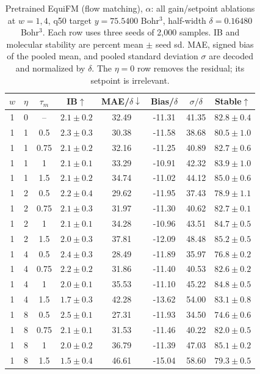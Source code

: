 \documentclass{article}
\begin{document}
\begin{table}[!htbp]
\centering\small
\caption{Pretrained EquiFM (flow matching), $\alpha$: all gain/setpoint ablations at $w=1,4$, q50 target $y=75.5400$ Bohr$^3$, half-width $\delta=0.16480$ Bohr$^3$. Each row uses three seeds of 2,000 samples. IB and molecular stability are percent mean $\pm$ seed sd. MAE, signed bias of the pooled mean, and pooled standard deviation $\sigma$ are decoded and normalized by $\delta$. The $\eta=0$ row removes the residual; its setpoint is irrelevant.}
\label{tab:grid-equifm-alpha}
\begin{tabular}{cccccccc}
\toprule
$w$ & $\eta$ & $\tau_m$ & IB$\uparrow$ & MAE/$\delta\downarrow$ & Bias/$\delta$ & $\sigma/\delta$ & Stable$\uparrow$\\
\midrule
1 & 0 & -- & $2.1\pm0.2$ & 32.49 & -11.31 & 41.35 & $82.8\pm0.4$\\
1 & 1 & 0.5 & $2.3\pm0.3$ & 30.38 & -11.58 & 38.68 & $80.5\pm1.0$\\
1 & 1 & 0.75 & $2.1\pm0.2$ & 32.16 & -11.25 & 40.89 & $82.7\pm0.6$\\
1 & 1 & 1 & $2.1\pm0.1$ & 33.29 & -10.91 & 42.32 & $83.9\pm1.0$\\
1 & 1 & 1.5 & $2.1\pm0.2$ & 34.74 & -11.02 & 44.12 & $85.0\pm0.6$\\
1 & 2 & 0.5 & $2.2\pm0.4$ & 29.62 & -11.95 & 37.43 & $78.9\pm1.1$\\
1 & 2 & 0.75 & $2.1\pm0.3$ & 31.97 & -11.30 & 40.62 & $82.7\pm0.1$\\
1 & 2 & 1 & $2.1\pm0.1$ & 34.28 & -10.96 & 43.51 & $84.7\pm0.5$\\
1 & 2 & 1.5 & $2.0\pm0.3$ & 37.81 & -12.09 & 48.48 & $85.2\pm0.5$\\
1 & 4 & 0.5 & $2.4\pm0.3$ & 28.49 & -11.89 & 35.97 & $76.8\pm0.2$\\
1 & 4 & 0.75 & $2.2\pm0.2$ & 31.86 & -11.40 & 40.53 & $82.6\pm0.2$\\
1 & 4 & 1 & $2.0\pm0.1$ & 35.53 & -11.10 & 45.22 & $84.8\pm0.5$\\
1 & 4 & 1.5 & $1.7\pm0.3$ & 42.28 & -13.62 & 54.00 & $83.1\pm0.8$\\
1 & 8 & 0.5 & $2.5\pm0.1$ & 27.31 & -11.93 & 34.50 & $74.6\pm0.6$\\
1 & 8 & 0.75 & $2.1\pm0.1$ & 31.53 & -11.46 & 40.22 & $82.0\pm0.5$\\
1 & 8 & 1 & $2.0\pm0.2$ & 36.79 & -11.39 & 47.03 & $85.1\pm0.2$\\
1 & 8 & 1.5 & $1.5\pm0.4$ & 46.61 & -15.04 & 58.60 & $79.3\pm0.5$\\

\end{tabular}
\end{table}
\end{document}
